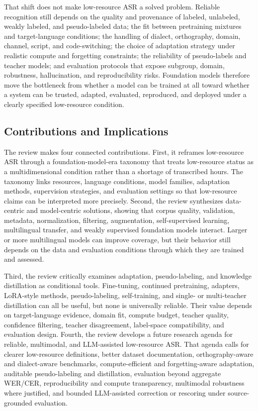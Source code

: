 \documentclass[pdflatex,sn-basic,iicol]{sn-jnl}
\theoremstyle{thmstyleone}
\theoremstyle{thmstyletwo}
\theoremstyle{thmstylethree}
\begin{document}
That shift does not make low-resource ASR a solved problem. Reliable recognition still depends on the quality and provenance of labeled, unlabeled, weakly labeled, and pseudo-labeled data; the fit between pretraining mixtures and target-language conditions; the handling of dialect, orthography, domain, channel, script, and code-switching; the choice of adaptation strategy under realistic compute and forgetting constraints; the reliability of pseudo-labels and teacher models; and evaluation protocols that expose subgroup, domain, robustness, hallucination, and reproducibility risks. Foundation models therefore move the bottleneck from whether a model can be trained at all toward whether a system can be trusted, adapted, evaluated, reproduced, and deployed under a clearly specified low-resource condition.

\subsection{Contributions and Implications}

The review makes four connected contributions. First, it reframes low-resource ASR through a foundation-model-era taxonomy that treats low-resource status as a multidimensional condition rather than a shortage of transcribed hours. The taxonomy links resources, language conditions, model families, adaptation methods, supervision strategies, and evaluation settings so that low-resource claims can be interpreted more precisely. Second, the review synthesizes data-centric and model-centric solutions, showing that corpus quality, validation, metadata, normalization, filtering, augmentation, self-supervised learning, multilingual transfer, and weakly supervised foundation models interact. Larger or more multilingual models can improve coverage, but their behavior still depends on the data and evaluation conditions through which they are trained and assessed.

Third, the review critically examines adaptation, pseudo-labeling, and knowledge distillation as conditional tools. Fine-tuning, continued pretraining, adapters, LoRA-style methods, pseudo-labeling, self-training, and single- or multi-teacher distillation can all be useful, but none is universally reliable. Their value depends on target-language evidence, domain fit, compute budget, teacher quality, confidence filtering, teacher disagreement, label-space compatibility, and evaluation design. Fourth, the review develops a future research agenda for reliable, multimodal, and LLM-assisted low-resource ASR. That agenda calls for clearer low-resource definitions, better dataset documentation, orthography-aware and dialect-aware benchmarks, compute-efficient and forgetting-aware adaptation, auditable pseudo-labeling and distillation, evaluation beyond aggregate WER/CER, reproducibility and compute transparency, multimodal robustness where justified, and bounded LLM-assisted correction or rescoring under source-grounded evaluation.
\end{document}
